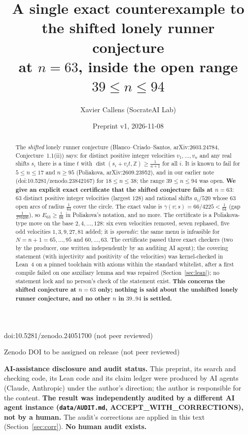 \documentclass[10pt]{article}
\title{A single exact counterexample to the shifted lonely runner conjecture\\
at $n=63$, inside the open range $39\le n\le94$}
\author{Xavier Callens (SocrateAI Lab)}
\date{Preprint v1, 2026-11-08}
\newcommand{\Z}{\mathbb{Z}}
\newcommand{\dist}{\operatorname{dist}}
\begin{document}
\maketitle
\begin{center}\small doi:10.5281/zenodo.24051700 \quad (not peer reviewed)\end{center}

\begin{center}\small Zenodo DOI to be assigned on release \quad (not peer reviewed)\end{center}

\noindent\textbf{AI-assistance disclosure and audit status.} This preprint, its search and checking code, its Lean code and its claim ledger were
produced by AI agents (Claude, Anthropic) under the author's direction; the author is responsible for the content.
\textbf{The result was independently audited by a different AI agent instance (\texttt{data/AUDIT.md}, ACCEPT\_WITH\_CORRECTIONS), not by a human.}
The audit's corrections are applied in this text (Section~\ref{sec:corr}). \textbf{No human audit exists.}

\begin{abstract}
The \emph{shifted} lonely runner conjecture (Blanco--Criado--Santos, arXiv:2603.24784, Conjecture~1.1(ii)) says: for distinct positive integer velocities $v_1,\dots,v_n$ and any real shifts $s_i$ there is a time $t$ with $\dist(s_i+v_it,\Z)\ge\frac1{n+1}$ for all $i$. It is known to fail for $5\le n\le17$ and $n\ge95$ (Poliakova, arXiv:2609.23952), and in our earlier note (doi:10.5281/zenodo.23842167) for $18\le n\le38$; the range $39\le n\le94$ was open.
\textbf{We give an explicit exact certificate that the shifted conjecture fails at $n=63$}: $63$ distinct positive integer velocities (largest $128$) and rational shifts $a_i/520$ whose $63$ open arcs of radius $\frac1{64}$ cover the circle. The exact value is $\gamma(v;s)=66/4225<\frac1{64}$ (gap $\frac1{270400}$), so $E_{63}\ge\frac1{66}$ in Poliakova's notation, and no more. The certificate is a Poliakova-type move on the base $2,4,\dots,128$: six even velocities removed, seven rephased, five odd velocities $1,3,9,27,81$ added; it is \emph{sporadic}: the same menu is infeasible for $N=n+1=65,\dots,95$ and $60,\dots,63$.
The certificate passed three exact checkers (two by the producer, one written independently by an auditing AI agent); the covering statement (with injectivity and positivity of the velocities) was kernel-checked in Lean~4 on a pinned toolchain with axioms within the standard whitelist, after a first compile failed on one auxiliary lemma and was repaired (Section~\ref{sec:lean}); no statement lock and no person's check of the statement exist. \textbf{This concerns the shifted conjecture at $n=63$ only; nothing is said about the unshifted lonely runner conjecture, and no other $n$ in $39..94$ is settled.}
\end{abstract}
\end{document}
